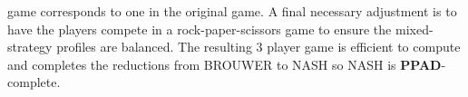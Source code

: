 \documentclass[]{article}
\begin{document}
game corresponds to one in the original game. A final necessary adjustment is to have the players compete in a rock-paper-scissors game to ensure the mixed-strategy profiles are balanced. The resulting 3 player game is efficient to compute and completes the reductions from \textsc{BROUWER} to \textsc{NASH} so \textsc{NASH} is \textbf{PPAD}-complete.
\end{document}
